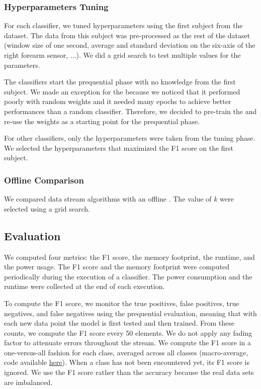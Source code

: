 \subsubsection{Hyperparameters Tuning}
For each classifier, we tuned hyperparameters  using the first subject from the
\banosdataset dataset.  The data from this subject was pre-processed as the rest
of the \banosdataset dataset (window size of one second, average and standard
deviation on the six-axis of the right forearm sensor, $\ldots$). We did a grid
search to test multiple values for the parameters.

The classifiers start the prequential phase with no knowledge from the first
subject.  We made an exception for the \FNN because we noticed that it performed
poorly with random weights and it needed many epochs to achieve better
performances than a random  classifier. Therefore, we decided to pre-train the
\FNN and re-use the weights as a starting point for the prequential phase.

For other classifiers, only the hyperparameters were taken from the tuning
phase.  We selected the hyperparameters that maximized the F1 score on the first
subject.

\subsubsection{Offline Comparison}
We compared data stream algorithms with an offline \knn. The value of $k$ were
selected using a grid search.

\subsection{Evaluation}
We computed four metrics: the F1 score, the memory
footprint, the runtime, and the power usage.
The F1 score and the memory
footprint were computed periodically during the
execution of a classifier. The
power consumption and the runtime were collected
at the end of each execution.

To compute the F1 score, we monitor the true positives, false positives, true
negatives, and false negatives using the prequential evaluation, meaning that
with each new data point the model is first tested and then trained.  From these
counts, we compute the F1 score every 50 elements. We do not apply any fading
factor to attenuate errors throughout the stream.  We compute the F1 score in a
one-versus-all fashion for each class, averaged across all classes
(macro-average, code available
\href{https://github.com/azazel7/paper-benchmark/blob/9adb1039c5a65a00a66d554f0e870d14d3fff7cb/main.cpp\#L82}{here}).
When a class has not been encountered yet, its F1 score is ignored. We use the
F1 score rather than the accuracy because the real data sets are imbalanced.

